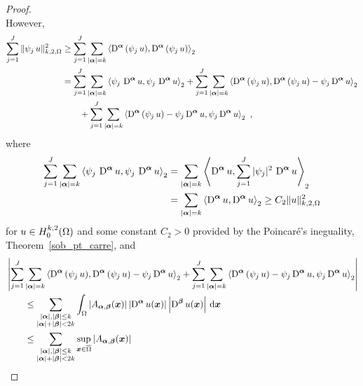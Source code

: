 \begin{proof}
\begin{equation}
\end{equation}
However,
\begin{align}
\sum_{j=1}^J  \| \psi_j \, u \|_{k,2,\Omega}^2 &\geq
\sum_{j=1}^J  \sum_{|{\bm{\alpha}}| = k}
\left\langle{\operatorname{D}^{{\bm{\alpha}}} \left( \psi_j \, u\right)} , {\operatorname{D}^{{\bm{\alpha}}} \left( \psi_j \, u\right)}\right\rangle_2 \nonumber \\
&= \sum_{j=1}^J  \sum_{|{\bm{\alpha}}| = k}
\left\langle{\psi_j \,\operatorname{D}^{{\bm{\alpha}}} u} , {\psi_j \, \operatorname{D}^{{\bm{\alpha}}} u}\right\rangle_2
+ \sum_{j=1}^J  \sum_{|{\bm{\alpha}}|= k}
\left\langle{\operatorname{D}^{{\bm{\alpha}}}\left( \psi_j \, u\right)} , {\operatorname{D}^{{\bm{\alpha}}}\left( \psi_j \, u\right)
- \psi_j \operatorname{D}^{{\bm{\alpha}}} u}\right\rangle_2 \nonumber \\
&\qquad + \sum_{j=1}^J  \sum_{|{\bm{\alpha}}|= k}
\left\langle{\operatorname{D}^{{\bm{\alpha}}}\left( \psi_j \, u\right)
- \psi_j \operatorname{D}^{{\bm{\alpha}}} u} , {\psi_j \operatorname{D}^{{\bm{\alpha}}} u}\right\rangle_2
\ , \label{ell_garding_idx4}
\end{align}
where
\begin{align*}
\sum_{j=1}^J  \sum_{|{\bm{\alpha}}| = k}
\left\langle{\psi_j \,\operatorname{D}^{{\bm{\alpha}}} u} , {\psi_j \, \operatorname{D}^{{\bm{\alpha}}} u}\right\rangle_2
&= \sum_{|{\bm{\alpha}}| = k}
\left\langle{\operatorname{D}^{{\bm{\alpha}}} u} , { \sum_{j=1}^J |\psi_j|^2 \,\operatorname{D}^{{\bm{\alpha}}} u}\right\rangle_2
\\
& = \sum_{|{\bm{\alpha}}| = k} \left\langle{\operatorname{D}^{{\bm{\alpha}}} u} , {\operatorname{D}^{{\bm{\alpha}}} u}\right\rangle_2
\geq C_2 \|u\|_{k,2,\Omega}^2
\end{align*}
for $\displaystyle u \in H^{k,2}_0(\Omega)$ and
some constant $C_2>0$ provided by the Poincaré's ineguality,
Theorem~\ref{sob_pt_carre}, and
\begin{align*}
& \left| \sum_{j=1}^J \sum_{|\VEC{\alpha}|= k}
\ps{\diff^{\VEC{\alpha}}\left( \psi_j \, u\right)}
{\diff^{\VEC{\alpha}}\left( \psi_j \, u\right) - \psi_j \diff^{\VEC{\alpha}} u}_2
+ \sum_{j=1}^J  \sum_{|\VEC{\alpha}|= k}
\ps{\diff^{\VEC{\alpha}}\left( \psi_j \, u\right)
- \psi_j \diff^{\VEC{\alpha}} u}{\psi_j \diff^{\VEC{\alpha}} u}_2 \right| \\
&\qquad \leq \sum_{\substack{|\VEC{\alpha}|,|\VEC{\beta}|\leq k\\
|\VEC{\alpha}|+|\VEC{\beta}|<2k}}
\int_\Omega \left| A_{\VEC{\alpha},\VEC{\beta}}(\VEC{x})\right|
\left| \diff^{\VEC{\alpha}} u(\VEC{x}) \right|
\left| \diff^{\VEC{\beta}} u(\VEC{x}) \right| \dx{\VEC{x}} \\
&\qquad \leq \sum_{\substack{|\VEC{\alpha}|,|\VEC{\beta}|\leq k\\
|\VEC{\alpha}|+|\VEC{\beta}|<2k}} \sup_{\VEC{x} \in \overline{\Omega}}
\left| A_{\VEC{\alpha},\VEC{\beta}}(\VEC{x})\right|

\end{align*}
\end{proof}
